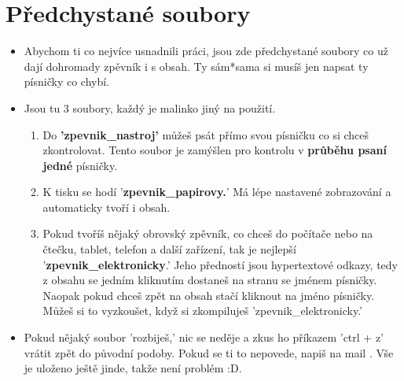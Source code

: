 \documentclass[12pt, notitlepage]{scrartcl}
\begin{document}
\section{Předchystané soubory}
\label{Předchystanésoubory}
\begin{itemize}
    \item Abychom ti co nejvíce usnadnili práci, jsou zde předchystané soubory co už dají dohromady zpěvník i s obsah. Ty sám*sama si musíš jen napsat ty písničky co chybí.
    \item Jsou tu 3 soubory, každý je malinko jiný na použití.
    \begin{enumerate}
        \item Do \textbf{'zpevnik\_nastroj'} můžeš psát přímo svou písničku co si chceš zkontrolovat. Tento soubor je zamýšlen pro kontrolu v \textbf{průběhu psaní jedné} písničky.
        \item K tisku se hodí '\textbf{zpevnik\_papirovy.}' Má lépe nastavené zobrazování a automaticky tvoří i obsah.
        \item Pokud tvoříš nějaký obrovský zpěvník, co chceš do počítače nebo na čtečku, tablet, telefon a další zařízení, tak je nejlepší '\textbf{zpevnik\_elektronicky}.' Jeho předností jsou hypertextové odkazy, tedy z obsahu se jedním kliknutím dostaneš na stranu se jménem písničky. Naopak pokud chceš zpět na obsah stačí kliknout na jméno písničky. Můžeš si to vyzkoušet, když si zkompiluješ 'zpevnik\_elektronicky.'
    \end{enumerate}
    \item Pokud nějaký soubor 'rozbiješ,' nic se neděje a zkus ho příkazem 'ctrl + z' vrátit zpět do původní podoby. Pokud se ti to nepovede, napiš na mail \cite{bib:kontakt}. Vše je uloženo ještě jinde, takže není problém :D.
\end{itemize}
\end{document}
